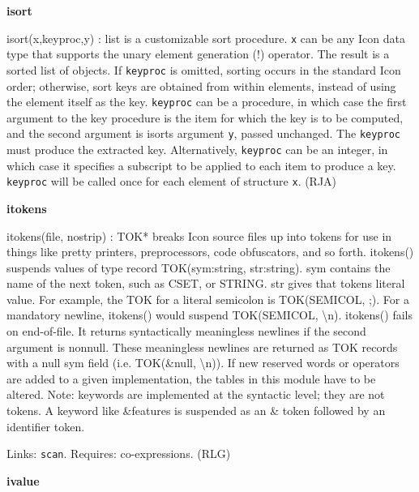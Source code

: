 {\sffamily\bfseries
isort}

\textsf{i}\textsf{sort}\textsf{(x,keyproc,y) : list} is a
customizable sort procedure. \texttt{x} can be any Icon data type that
supports the unary element generation (!) operator. The result is a
sorted list of objects. If \texttt{keyproc} is omitted, sorting occurs
in the standard Icon order; otherwise, sort keys are obtained from
within elements, instead of using the element itself as the key.
\texttt{keyproc} can be a procedure, in which case the first argument
to the key procedure is the item for which the key is to be computed,
and the second argument is isort{\textquotesingle}s argument
\texttt{y}, passed unchanged. The \texttt{keyproc} must produce the
extracted key. Alternatively, \texttt{keyproc} can be an integer, in
which case it specifies a subscript to be applied to each item to
produce a key. \texttt{keyproc} will be called once for each element of
structure \texttt{x}. (RJA)

{\sffamily\bfseries
itokens}

\textsf{itokens(file, nostrip) : TOK*} breaks Icon source files up into
tokens for use in things like pretty printers, preprocessors, code
obfuscators, and so forth. itokens() suspends values of type
\textsf{record TOK(sym:string, str:string). sym} contains the name of
the next token, such as \textsf{{\textquotedbl}CSET{\textquotedbl}}, or
\textsf{{\textquotedbl}STRING{\textquotedbl}. str} gives that
token{\textquotesingle}s literal value. For example, the \textsf{TOK}
for a literal semicolon is
\textsf{TOK({\textquotedbl}SEMICOL{\textquotedbl},
{\textquotedbl};{\textquotedbl})}. For a mandatory newline,
\textsf{itokens()} would suspend
\textsf{TOK({\textquotedbl}SEMICOL{\textquotedbl},
{\textquotedbl}{\textbackslash}n{\textquotedbl}). itokens()} fails on
end-of-file. It returns syntactically meaningless newlines if the
second argument is nonnull. These meaningless newlines are returned as
TOK records with a null sym field (i.e. \textsf{TOK(\&null,
{\textquotedbl}{\textbackslash}n{\textquotedbl})}). If new reserved
words or operators are added to a given implementation, the tables in
this module have to be altered. Note: keywords are implemented at the
syntactic level; they are not tokens. A keyword like
\textsf{\&features} is suspended as an \textsf{\&} token followed by an
identifier token.

Links: \texttt{scan}. Requires: co-expressions. (RLG)

{\sffamily\bfseries
ivalue}

